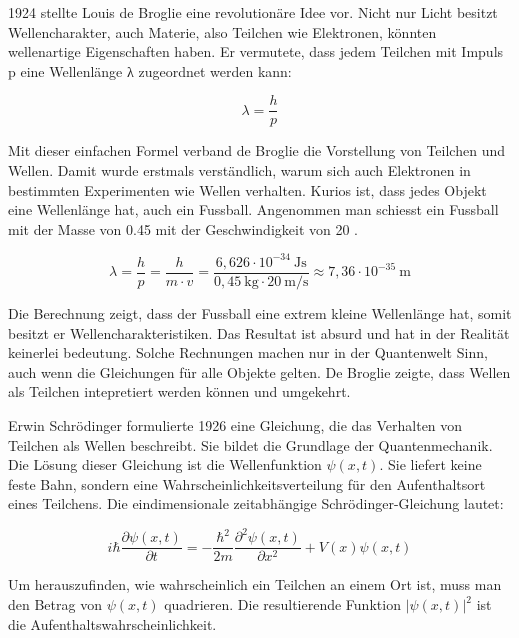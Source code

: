 	
	1924 stellte Louis de Broglie eine revolutionäre Idee vor.
	Nicht nur Licht besitzt Wellencharakter, auch Materie, also Teilchen wie Elektronen, könnten wellenartige Eigenschaften haben.
	Er vermutete, dass jedem Teilchen mit Impuls p eine Wellenlänge λ zugeordnet werden kann:
	
	\begin{equation}
		\lambda = \frac{h}{p}
	\end{equation}	
	
	Mit dieser einfachen Formel verband de Broglie die Vorstellung von Teilchen und Wellen. Damit wurde erstmals verständlich, warum sich auch Elektronen in bestimmten Experimenten wie Wellen verhalten.
	Kurios ist, dass jedes Objekt eine Wellenlänge hat, auch ein Fussball.
	Angenommen man schiesst ein Fussball mit der Masse von 0.45  mit der Geschwindigkeit von 20 .
	
	\begin{equation}
		\lambda = \frac{h}{p} = \frac{h}{m \cdot v} = 	\frac{6{,}626 \cdot 10^{-34} \ \text{Js}}{0{,}45 \ \text{kg} \cdot 20 \ \text{m/s}} \approx 7{,}36 \cdot 10^{-35} \ \text{m}
	\end{equation}	
	
	Die Berechnung zeigt, dass der Fussball eine extrem kleine Wellenlänge hat, somit besitzt er Wellencharakteristiken.
	Das Resultat ist absurd und hat in der Realität keinerlei bedeutung.
	Solche Rechnungen machen nur in der Quantenwelt Sinn, auch wenn die Gleichungen für alle Objekte gelten. 
	De Broglie zeigte, dass Wellen als Teilchen intepretiert werden können und umgekehrt. 
	
	
	
	Erwin Schrödinger formulierte 1926 eine Gleichung, die das Verhalten von Teilchen als Wellen beschreibt. 
	Sie bildet die Grundlage der Quantenmechanik. Die Lösung dieser Gleichung ist die Wellenfunktion \( \psi(x, t) \). Sie liefert keine feste Bahn, sondern eine Wahrscheinlichkeitsverteilung für den Aufenthaltsort eines Teilchens.  
	Die eindimensionale zeitabhängige Schrödinger-Gleichung lautet:
	
	\begin{equation}\label{fourier:equation:zeitabhaengigeSchroedingerGleichung}
		i \hbar \frac{\partial \psi(x,t)}{\partial t} = -\frac{\hbar^2}{2m} \frac{\partial^2 \psi(x,t)}{\partial x^2} + V(x) \psi(x,t)
	\end{equation}
	
	
	Um herauszufinden, wie wahrscheinlich ein Teilchen an einem Ort ist, muss man den Betrag von $\psi(x, t)$ quadrieren. 
	Die resultierende Funktion $|\psi(x, t)|^2$ ist die Aufenthaltswahrscheinlichkeit. 
	
